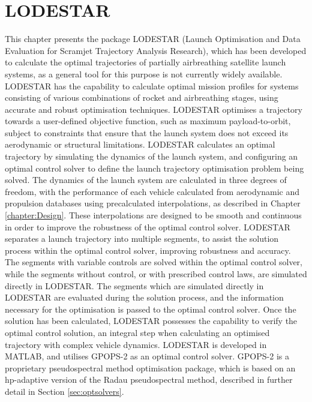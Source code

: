 
\cleardoublepage
\chapter{LODESTAR}\label{chapter:LODESTAR}


This chapter presents the package LODESTAR (Launch Optimisation and Data Evaluation for Scramjet Trajectory Analysis Research), which has been developed to calculate the optimal trajectories of partially airbreathing satellite launch systems, as a general tool for this purpose is not currently widely available. LODESTAR has the capability to calculate optimal mission profiles for systems consisting of various combinations of rocket and airbreathing stages, using accurate and robust optimisation techniques. 
LODESTAR optimises a trajectory towards a user-defined objective function, such as maximum payload-to-orbit, subject to constraints that ensure that the launch system does not exceed its aerodynamic or structural limitations.
LODESTAR calculates an optimal trajectory by simulating the dynamics of the launch system, and configuring an optimal control solver to define the launch trajectory optimisation problem being solved. 
The dynamics of the launch system are calculated in three degrees of freedom, with the performance of each vehicle calculated from aerodynamic and propulsion databases using precalculated interpolations, as described in Chapter \ref{chapter:Design}. These interpolations are designed to be smooth and continuous in order to improve the robustness of the optimal control solver.
LODESTAR separates a launch trajectory into multiple segments, to assist the solution process within the optimal control solver, improving robustness and accuracy. The segments with variable controls are solved within the optimal control solver, while the segments without control, or with prescribed control laws, are simulated directly in LODESTAR.
The segments which are simulated directly in LODESTAR are evaluated during the solution process, and the information necessary for the optimisation is passed to the optimal control solver.
Once the solution has been calculated, LODESTAR possesses the capability to verify the optimal control solution, an integral step when calculating an optimised trajectory with complex vehicle dynamics. 
LODESTAR is developed in MATLAB, and utilises GPOPS-2\cite{Patterson2015} as an optimal control solver. GPOPS-2 is a proprietary pseudospectral method optimisation package, which is based on an \textsf{hp}-adaptive version of the Radau pseudospectral method, described in further detail in Section \ref{sec:optsolvers}. 


